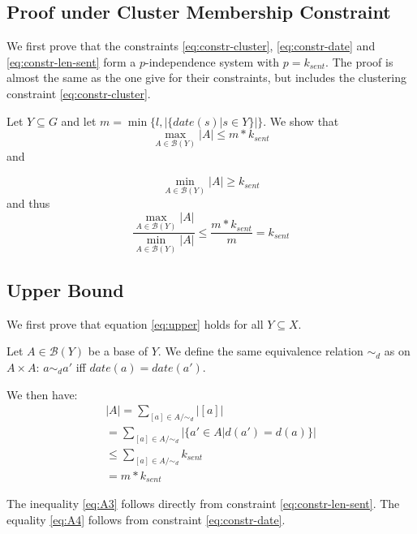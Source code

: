 \documentclass[a4paper,BCOR=10mm]{report}
\numberwithin{lemma}{chapter}
\numberwithin{definition}{chapter}
\begin{document}
\begin{appendices}
\section{Proof under Cluster Membership Constraint} \label{sec:proof-cluster-constr}

We first prove that the constraints \ref{eq:constr-cluster}, \ref{eq:constr-date} and \ref{eq:constr-len-sent} form a $p$-independence system with $p = k_{sent}$.
The proof is almost the same as the one \citet{markert} give for their constraints, but includes the clustering constraint \ref{eq:constr-cluster}.

Let $Y \subseteq G$ and let $m = \min \{ l, |\{\mathit{date}(s) | s \in Y\}| \}$.
We show that 
\begin{equation}
\max_{A \in \mathcal{B}(Y)} |A| \leq m * k_{sent} \label{eq:upper}
\end{equation}
 and

\begin{equation}
\min_{A \in \mathcal{B}(Y)} |A| \geq k_{sent} \label{eq:lower}
\end{equation}
and thus 
\begin{equation}
\frac{\max_{A \in \mathcal{B}(Y)} |A|}{\min_{A \in \mathcal{B}(Y)} |A|}
\leq \frac{m * k_{sent}}{m} = k_{sent}    
\end{equation}

\subsection{Upper Bound} \label{sec:cluster-upper-bound}

We first prove that equation \ref{eq:upper} holds for all $Y \subseteq X$.

Let $A \in \mathcal{B}(Y)$ be a base of $Y$. We define the same equivalence relation $\sim_d$ as \citeauthor{markert} on $A \times A$:
$a \sim_d a'$ iff $\mathit{date}(a) = \mathit{date}(a')$.

We then have:
\begin{align}
|A| = \sum_{[a] \in A/\sim_d} |[a]| \\
    = \sum_{[a] \in A/\sim_d} |\{ a' \in A | d(a') = d(a) \}| \label{eq:A2} \\
    \leq \sum_{[a] \in A/\sim_d} k_{sent} \label{eq:A3} \\
    = m * k_{sent} \label{eq:A4}
\end{align}

The inequality \ref{eq:A3} follows directly from constraint \ref{eq:constr-len-sent}.
The equality \ref{eq:A4} follows from constraint \ref{eq:constr-date}.



\end{appendices}
\end{document}
